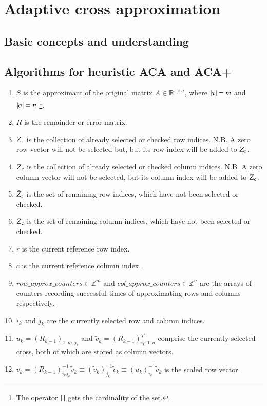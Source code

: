 \documentclass[11pt, a4paper]{book}
\begin{document}
\chapter{Adaptive cross approximation}
\label{sec:aca}

\section{Basic concepts and understanding}

\section{Algorithms for heuristic ACA and ACA+}

\begin{enumerate}
\item $S$ is the approximant of the original matrix $A\in\mathbb{R}^{\tau\times\sigma}$,
  where $\lvert\tau\rvert=m$ and $\lvert\sigma\rvert=n$ \footnote{The operator $\lvert\cdot\rvert$ gets the
    cardinality of the set.}.
\item $R$ is the remainder or error matrix.
\item $Z_{\rm r}$ is the collection of already selected or checked row indices. N.B. A
  zero row vector will not be selected but, but its row index will be added to $Z_{\rm r}$.
\item $Z_{\rm c}$ is the collection of already selected or checked column indices. N.B. A
  zero column vector will not be selected, but its column index will be added to $Z_{\rm c}$.
\item $\bar{Z}_{\rm r}$ is the set of remaining row indices, which have not been selected or checked.
\item $\bar{Z}_{\rm c}$ is the set of remaining column indices, which have not been selected or checked.
\item $r$ is the current reference row index.
\item $c$ is the current reference column index.
\item $row\_approx\_counters\in\mathbb{Z}^m$ and $col\_approx\_counters\in\mathbb{Z}^{n}$ are the arrays of counters recording successful times of approximating rows and columns respectively.
\item $i_k$ and $j_k$ are the currently selected row and column indices.
\item $u_k=(R_{k-1})_{1:m,j_k}$ and $\widetilde{v}_k=(R_{k-1})_{i_k,1:n}^T$ comprise the currently selected cross, both of which are stored as column vectors.
\item $v_k=(R_{k-1})_{i_k j_k}^{-1}\widetilde{v}_{k}\equiv (\widetilde{v}_k)_{j_k}^{-1}\widetilde{v}_k \equiv (u_k)_{i_k}^{-1}\widetilde{v}_k$ is the scaled row vector.

\end{enumerate}
\end{document}
